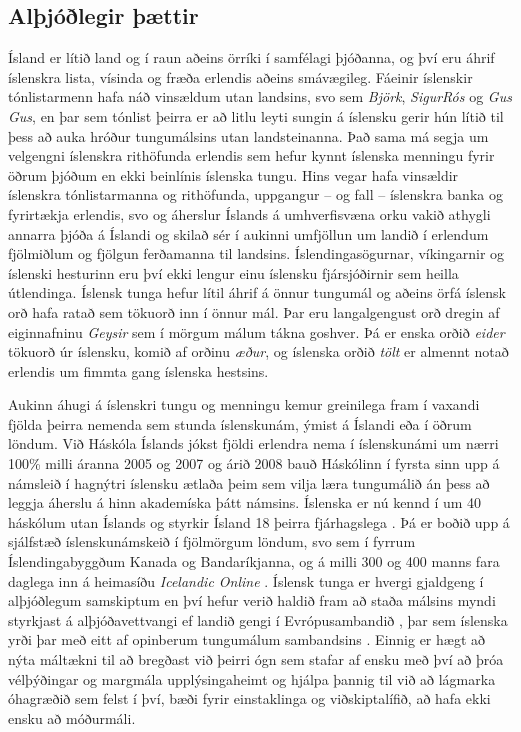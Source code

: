 \begin{multicols}{2}
\subsection{Alþjóðlegir þættir}

Ísland er lítið land og í raun aðeins örríki í samfélagi þjóðanna, og því eru áhrif íslenskra lista, vísinda og fræða erlendis aðeins smávægileg. Fáeinir íslenskir tónlistarmenn hafa náð vinsældum utan landsins, svo sem \textit{Björk}, \textit{SigurRós} og \textit{Gus Gus}, en þar sem tónlist þeirra er að litlu leyti sungin á íslensku gerir hún lítið til þess að auka hróður tungumálsins utan landsteinanna. Það sama má segja um velgengni íslenskra rithöfunda erlendis sem hefur kynnt íslenska menningu fyrir öðrum þjóðum en ekki beinlínis íslenska tungu. Hins vegar hafa vinsældir íslenskra tónlistarmanna og rithöfunda, uppgangur -- og fall -- íslenskra banka og fyrirtækja erlendis, svo og áherslur Íslands á umhverfisvæna orku vakið athygli annarra þjóða á Íslandi og skilað sér í aukinni umfjöllun um landið í erlendum fjölmiðlum og fjölgun ferðamanna til landsins. Íslendingasögurnar, víkingarnir og íslenski hesturinn eru því ekki lengur einu íslensku fjársjóðirnir sem heilla útlendinga.
Íslensk tunga hefur lítil áhrif á önnur tungumál og aðeins örfá íslensk orð hafa ratað sem tökuorð inn í önnur mál. Þar eru langalgengust orð dregin af eiginnafninu \textit{Geysir} sem í mörgum málum tákna goshver. Þá er enska orðið \textit{eider} tökuorð úr íslensku, komið af orðinu \textit{æður}, og íslenska orðið \textit{tölt} er almennt notað erlendis um fimmta gang íslenska hestsins.

Aukinn áhugi á íslenskri tungu og menningu kemur greinilega fram í vaxandi fjölda þeirra nemenda sem stunda íslenskunám, ýmist á Íslandi eða í öðrum löndum. Við Háskóla Íslands jókst fjöldi erlendra nema í íslenskunámi um nærri 100\% milli áranna 2005 og 2007 og árið 2008 bauð Háskólinn í fyrsta sinn upp á námsleið í hagnýtri íslensku ætlaða þeim sem vilja læra tungumálið án þess að leggja áherslu á hinn akademíska þátt námsins. Íslenska er nú kennd í um 40 háskólum utan Íslands og styrkir Ísland 18 þeirra fjárhagslega \cite{isl1}.  Þá er boðið upp á sjálfstæð íslenskunámskeið í fjölmörgum löndum, svo sem í fyrrum Íslendingabyggðum Kanada og Bandaríkjanna, og á milli 300 og 400 manns fara daglega inn á heimasíðu \textit{Icelandic Online} \cite{iol1}. 
Íslensk tunga er hvergi gjaldgeng í alþjóðlegum samskiptum en því hefur verið haldið fram að staða málsins myndi styrkjast á alþjóðavettvangi ef landið gengi í Evrópusambandið \cite{vis2}, þar sem íslenska yrði þar með eitt af opinberum tungumálum sambandsins \cite{enl1}.  Einnig er hægt að nýta máltækni til að bregðast við þeirri ógn sem stafar af ensku með því að þróa vélþýðingar og margmála upplýsingaheimt og hjálpa þannig til við að lágmarka óhagræðið sem felst í því, bæði fyrir einstaklinga og viðskiptalífið, að hafa ekki ensku að móðurmáli.


\end{multicols}
